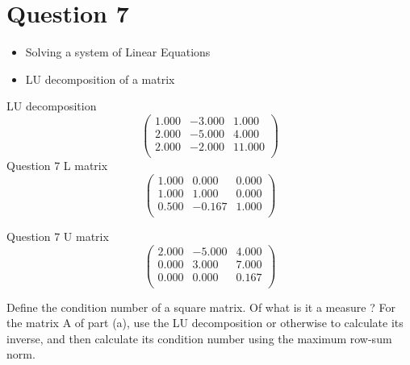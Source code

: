 \documentclass[11pt,a4paper,titlepage,oneside,openany]{article}
\numberwithin{equation}{section}
\numberwithin{algorithm}{section}
\numberwithin{figure}{section}
\numberwithin{table}{section}
\begin{document}
\section*{Question 7}
\large{
\begin{itemize}
\item Solving a system of Linear Equations
\item LU decomposition of a matrix
\end{itemize}
LU decomposition
\[
\left(
  \begin{array}{ccc}
 1.000& -3.000&  1.000\\
 2.000& -5.000&  4.000\\
 2.000& -2.000& 11.000\\
  \end{array}
\right)
\]
Question 7 L matrix
\[
\left(
  \begin{array}{ccc}
 1.000&  0.000&  0.000\\
 1.000&  1.000&  0.000\\
 0.500& -0.167&  1.000\\
  \end{array}
\right)
\]

Question 7 U matrix
\[
\left(
  \begin{array}{ccc}
 2.000 &-5.000 & 4.000\\
 0.000 & 3.000 &7.000\\
 0.000 & 0.000 &0.167\\
  \end{array}
\right)
\]

\newpage
Define the condition number of a square matrix. Of what is it a measure ?
For the matrix A of part (a), use the LU decomposition or otherwise
to calculate its inverse, and then calculate its condition number using
the maximum row-sum norm.



} %
\end{document}
